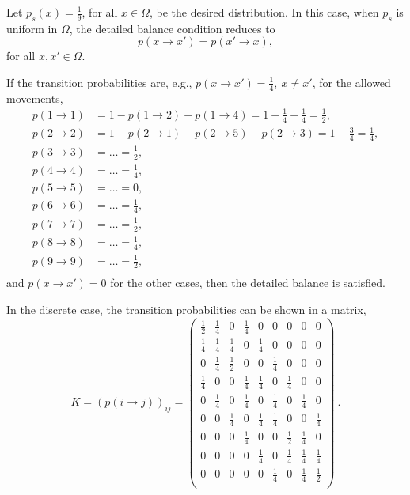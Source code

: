 Let $p_s(x) = \frac{1}{9}$, for all $x\in\Omega$, be the desired distribution.
In this case, when $p_s$ is uniform in $\Omega$, the detailed balance condition reduces to 
$$
  p(x \rightarrow x') = p(x' \rightarrow x),
$$
for all $x,x' \in \Omega$.

If the transition probabilities are, e.g., $p(x \rightarrow x') = \frac{1}{4}, \ x \neq x'$, for the allowed movements,
$$
 \begin{aligned}
  p(1 \rightarrow 1) &= 1 - p(1 \rightarrow 2) - p(1 \rightarrow 4) = 1 - \frac{1}{4} - \frac{1}{4} = \frac{1}{2}, \\
  p(2 \rightarrow 2) &= 1 - p(2 \rightarrow 1) - p(2 \rightarrow 5) - p(2 \rightarrow 3) = 1 - \frac{3}{4} = \frac{1}{4}, \\
  p(3 \rightarrow 3) &= \dots = \frac{1}{2}, \\
  p(4 \rightarrow 4) &= \dots = \frac{1}{4}, \\
  p(5 \rightarrow 5) &= \dots = 0, \\
  p(6 \rightarrow 6) &= \dots = \frac{1}{4}, \\
  p(7 \rightarrow 7) &= \dots = \frac{1}{2}, \\
  p(8 \rightarrow 8) &= \dots = \frac{1}{4}, \\
  p(9 \rightarrow 9) &= \dots = \frac{1}{2}, \\
 \end{aligned}
$$
and $p(x \rightarrow x') = 0$ for the other cases, then the detailed balance is satisfied. 

In the discrete case, the transition probabilities can be shown in a matrix,
\begin{equation} \label{eq_MchainTransitionMatrix}
  K = \left( p(i \rightarrow j) \right)_{ij} = 
  \begin{pmatrix}
    \frac{1}{2} & \frac{1}{4} & 0 & \frac{1}{4} & 0 & 0 & 0 & 0 & 0 \\
    \frac{1}{4} & \frac{1}{4} & \frac{1}{4} & 0 & \frac{1}{4} & 0 & 0 & 0 & 0 \\
    0 & \frac{1}{4} & \frac{1}{2} & 0 & 0 & \frac{1}{4} & 0 & 0 & 0 \\
    \frac{1}{4} & 0 & 0 & \frac{1}{4} & \frac{1}{4} & 0 & \frac{1}{4} & 0 & 0 \\
    0 & \frac{1}{4} & 0 & \frac{1}{4} & 0 & \frac{1}{4} & 0 & \frac{1}{4} & 0 \\
    0 & 0 & \frac{1}{4} & 0 & \frac{1}{4} & \frac{1}{4} & 0 & 0 & \frac{1}{4} \\
    0 & 0 & 0 & \frac{1}{4} & 0 & 0 & \frac{1}{2} & \frac{1}{4} & 0 \\
    0 & 0 & 0 & 0 & \frac{1}{4} & 0 & \frac{1}{4} & \frac{1}{4} & \frac{1}{4} \\
    0 & 0 & 0 & 0 & 0 & \frac{1}{4} & 0 & \frac{1}{4} & \frac{1}{2} \\
  \end{pmatrix} \ .
\end{equation}

